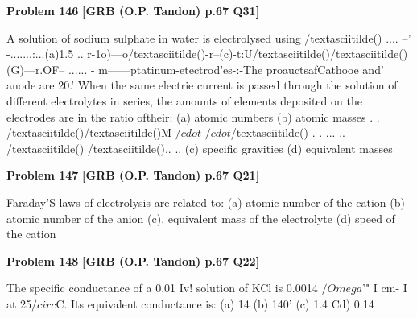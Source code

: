 \begin{problembox}
\textbf{Problem 146} \hfill \textbf{[GRB (O.P. Tandon) p.67 Q31]}
\label{q:ext-grb_all_questions-146}

A solution of sodium sulphate in water is electrolysed using 
/textasciitilde() 
.... --' -.......:...(a)1.5 .. r-1o)---o/textasciitilde()-r--(c)-t:U/textasciitilde()/textasciitilde()(G)---r.OF-- ...... -
m------ptatinum-etectrod'es-:-The proauctsafCathooe and' anode are 
20.' When the same electrie current is passed through the solution 
of different electrolytes in series, the amounts of elements 
deposited on the electrodes are in the ratio oftheir: 
(a) atomic numbers 
(b) atomic masses 
. \underline{\hspace{1cm}} . 
\underline{\hspace{1cm}} /textasciitilde()\underline{\hspace{1cm}}/textasciitilde()\underline{\hspace{1cm}}M \underline{\hspace{1cm}} $/cdot$ \underline{\hspace{1cm}} $/cdot$/textasciitilde() \underline{\hspace{1cm}} \underline{\hspace{1cm}} . \underline{\hspace{1cm}} . \underline{\hspace{1cm}} ... \underline{\hspace{1cm}} 
.. /textasciitilde() \underline{\hspace{1cm}} /textasciitilde()\underline{\hspace{1cm}},\underline{\hspace{1cm}}. 
\underline{\hspace{1cm}} .. 
(c) specific gravities 
(d) equivalent masses
\end{problembox}

\begin{problembox}
\textbf{Problem 147} \hfill \textbf{[GRB (O.P. Tandon) p.67 Q21]}
\label{q:ext-grb_all_questions-147}

Faraday'S laws of electrolysis are related to: \underline{\hspace{1cm}} 
(a) atomic number of the cation 
(b) atomic number of the anion 
(c), equivalent mass of the electrolyte 
(d) speed of the cation
\end{problembox}

\begin{problembox}
\textbf{Problem 148} \hfill \textbf{[GRB (O.P. Tandon) p.67 Q22]}
\label{q:ext-grb_all_questions-148}

The specific conductance of a 0.01 Iv! solution of KCl is 
0.0014 $/Omega$'" I cm- I at 25$/circ$C. Its equivalent conductance is: 
(a) 14 
(b) 140' 
(c) 1.4 
Cd) 0.14
\end{problembox}

